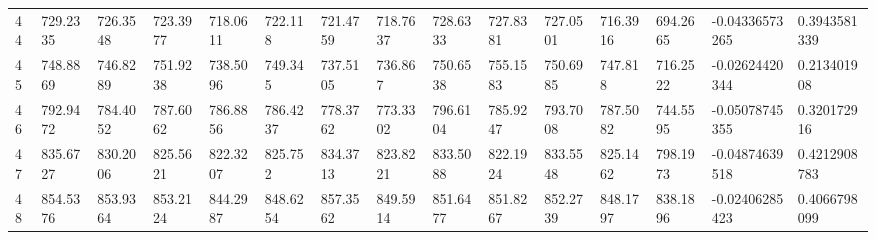 \begin{landscape}
{\begin{longtable}{@{}lllllllllllllll@{}}
		44                                           & 729.2335                 & 726.3548                 & 723.3977                 & 718.0611                 & 722.118                  & 721.4759                 & 718.7637                 & 728.6333                 & 727.8381                 & 727.0501                 & 716.3916                 & 694.2665                 & -0.04336573265                                                         & 0.3943581339                                    \\
		45                                           & 748.8869                 & 746.8289                 & 751.9238                 & 738.5096                 & 749.345                  & 737.5105                 & 736.867                  & 750.6538                 & 755.1583                 & 750.6985                 & 747.818                  & 716.2522                 & -0.02624420344                                                         & 0.213401908                                     \\
		46                                           & 792.9472                 & 784.4052                 & 787.6062                 & 786.8856                 & 786.4237                 & 778.3762                 & 773.3302                 & 796.6104                 & 785.9247                 & 793.7008                 & 787.5082                 & 744.5595                 & -0.05078745355                                                         & 0.320172916                                     \\
		47                                           & 835.6727                 & 830.2006                 & 825.5621                 & 822.3207                 & 825.752                  & 834.3713                 & 823.8221                 & 833.5088                 & 822.1924                 & 833.5548                 & 825.1462                 & 798.1973                 & -0.04874639518                                                         & 0.4212908783                                    \\
		48                                           & 854.5376                 & 853.9364                 & 853.2124                 & 844.2987                 & 848.6254                 & 857.3562                 & 849.5914                 & 851.6477                 & 851.8267                 & 852.2739                 & 848.1797                 & 838.1896                 & -0.02406285423                                                         & 0.4066798099                                    \\

\end{longtable}}
\end{landscape}
